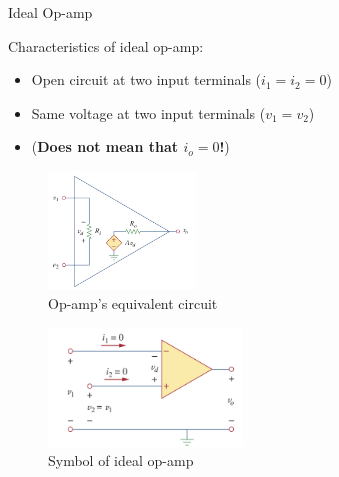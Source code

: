 \documentclass{beamer}
\begin{document}
\begin{frame}{Ideal Op-amp}

Characteristics of ideal op-amp:
\begin{itemize}
    \item Open circuit at two input terminals ($i_1 = i_2 = 0$)
    \item Same voltage at two input terminals ($v_1 = v_2$)
    \item (\textbf{Does not mean that $i_o = 0$!})
\end{itemize}

\begin{multicols}{2}
    \sectiont{}
    \begin{figure}[H]
        \centering
        \includegraphics[width=0.35\textwidth]{img_opamp/3_opamp equivalent.png}
        \caption{Op-amp's equivalent circuit}
    \end{figure}
    \sectiont{}
    \begin{figure}[H]
        \centering
        \includegraphics[width=0.46\textwidth]{img_opamp/4_ideal op amp.png}
        \caption{Symbol of ideal op-amp}
    \end{figure}
    
\end{multicols}
    
\end{frame}
\end{document}
